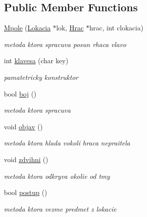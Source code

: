 \subsection*{Public Member Functions}
\begin{DoxyCompactItemize}
\item 
\hypertarget{class_mpole_afde0f9f2637657bc205f61564af2fa82}{\hyperlink{class_mpole_afde0f9f2637657bc205f61564af2fa82}{Mpole} (\hyperlink{class_lokacia}{Lokacia} $\ast$lok, \hyperlink{class_hrac}{Hrac} $\ast$hrac, int clokacia)}\label{class_mpole_afde0f9f2637657bc205f61564af2fa82}

\begin{DoxyCompactList}\small\item\em metoda ktora spracuva posun rhaca vlavo \end{DoxyCompactList}\item 
\hypertarget{class_mpole_aa133baee6547e3dfb4cf96d50ede2745}{int \hyperlink{class_mpole_aa133baee6547e3dfb4cf96d50ede2745}{klavesa} (char key)}\label{class_mpole_aa133baee6547e3dfb4cf96d50ede2745}

\begin{DoxyCompactList}\small\item\em pamatetricky konstruktor \end{DoxyCompactList}\item 
\hypertarget{class_mpole_a888a25f15e8bd4f5346b62d3cb64c33d}{bool \hyperlink{class_mpole_a888a25f15e8bd4f5346b62d3cb64c33d}{boj} ()}\label{class_mpole_a888a25f15e8bd4f5346b62d3cb64c33d}

\begin{DoxyCompactList}\small\item\em metoda ktora spracuva \end{DoxyCompactList}\item 
\hypertarget{class_mpole_ac63e2cb85985a843981dd05ab6e1e25a}{void \hyperlink{class_mpole_ac63e2cb85985a843981dd05ab6e1e25a}{objav} ()}\label{class_mpole_ac63e2cb85985a843981dd05ab6e1e25a}

\begin{DoxyCompactList}\small\item\em metoda ktora hlada vokoli hraca nepraitela \end{DoxyCompactList}\item 
\hypertarget{class_mpole_a4b8ec3339f346e769e8542b696cc8700}{void \hyperlink{class_mpole_a4b8ec3339f346e769e8542b696cc8700}{zdvihni} ()}\label{class_mpole_a4b8ec3339f346e769e8542b696cc8700}

\begin{DoxyCompactList}\small\item\em metoda ktora odkryva okolie od tmy \end{DoxyCompactList}\item 
\hypertarget{class_mpole_a4682f046dacdf4c3bdf3596113713fd3}{bool \hyperlink{class_mpole_a4682f046dacdf4c3bdf3596113713fd3}{postup} ()}\label{class_mpole_a4682f046dacdf4c3bdf3596113713fd3}

\begin{DoxyCompactList}\small\item\em metoda ktora vezme predmet z lokacie \end{DoxyCompactList}\end{DoxyCompactItemize}
